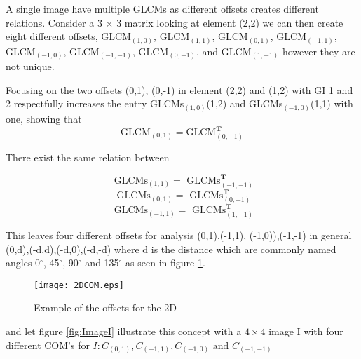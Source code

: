 A single image have multiple GLCMs as different offsets creates different relations. Consider a 3 $\times$ 3 matrix looking at element (2,2) we can then create eight different offsets, GLCM$_{(1,0)}$, GLCM$_{(1,1)}$, GLCM$_{(0,1)}$, GLCM$_{(-1,1)}$, GLCM$_{(-1,0)}$, GLCM$_{(-1,-1)}$, GLCM$_{(0,-1)}$, and GLCM$_{(1,-1)}$ however they are not unique. 

Focusing on the two offsets {(0,1), (0,-1)} in element (2,2) and (1,2) with GI 1 and 2 respectfully increases the entry GLCMs$_{(1,0)}$(1,2) and GLCMs$_{(-1,0)}$(1,1) with one, showing that 
\[
\text{GLCM}_{(0,1)} = \text{GLCM}_{(0,-1)}^\textbf{T}
\]

There exist the same relation between

\[
\text{ GLCMs}_{(1,1)}=\text{ GLCMs}_{(-1,-1)}^\textbf{T}
\]
\[
\text{ GLCMs}_{(0,1)}=\text{ GLCMs}_{(0,-1)}^\textbf{T}
\]
\[
\text{ GLCMs}_{(-1,1)}=\text{ GLCMs}_{(1,-1)}^\textbf{T}
\]


This leaves four different offsets for analysis {(0,1),(-1,1), (-1,0)),(-1,-1)} in general {(0,d),(-d,d),(-d,0),(-d,-d)} where d is the distance which are commonly named angles 0$^\circ$, 45$^\circ$, 90$^\circ$ and 135$^\circ$ as seen in figure \ref{2DCOM}.

\begin{figure}[H]
  \centering
  \texttt{[image: 2DCOM.eps]}
  \caption{Example of the offsets for the 2D}\label{2DCOM}
\end{figure}

and let figure \ref{fig:ImageI} illustrate this concept with a $4 \times 4$ image I with four different COM's for $I: C_{(0,1)}, C_{(-1,1)}, C_{(-1,0)} \text{ and } C_{(-1,-1)}$

